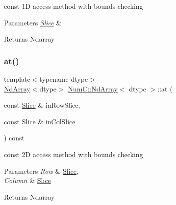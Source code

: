 const 1D access method with bounds checking


\begin{DoxyParams}{Parameters}
{\em \mbox{\hyperlink{class_num_c_1_1_slice}{Slice}}} & \\
\hline
\end{DoxyParams}
\begin{DoxyReturn}{Returns}
Ndarray 
\end{DoxyReturn}
\mbox{\label{class_num_c_1_1_nd_array_a45b3ca6d928b673c97bd9e2792a71706}} 
\subsubsection{\texorpdfstring{at()}{at()}\hspace{0.1cm}{\footnotesize\ttfamily [6/8]}}
{\footnotesize\ttfamily template$<$typename dtype$>$ \\
\mbox{\hyperlink{class_num_c_1_1_nd_array}{Nd\+Array}}$<$dtype$>$ \mbox{\hyperlink{class_num_c_1_1_nd_array}{Num\+C\+::\+Nd\+Array}}$<$ dtype $>$\+::at (\begin{DoxyParamCaption}\item[{const \mbox{\hyperlink{class_num_c_1_1_slice}{Slice}} \&}]{in\+Row\+Slice,  }\item[{const \mbox{\hyperlink{class_num_c_1_1_slice}{Slice}} \&}]{in\+Col\+Slice }\end{DoxyParamCaption}) const\hspace{0.3cm}{\ttfamily [inline]}}

const 2D access method with bounds checking


\begin{DoxyParams}{Parameters}
{\em Row} & \mbox{\hyperlink{class_num_c_1_1_slice}{Slice}}, \\
\hline
{\em Column} & \mbox{\hyperlink{class_num_c_1_1_slice}{Slice}} \\
\hline
\end{DoxyParams}
\begin{DoxyReturn}{Returns}
Ndarray 
\end{DoxyReturn}
\mbox{\label{class_num_c_1_1_nd_array_aa81e931f772bb2a452e77cfa6760f45c}} 

